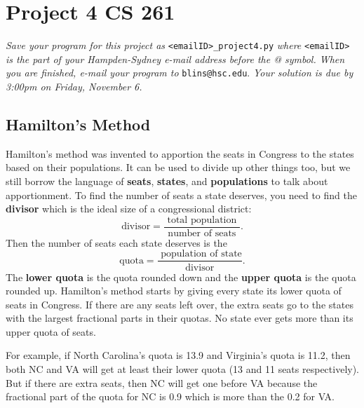 \documentclass[11pt]{article}
\begin{document}
\section*{Project 4 \hfill CS 261}

\textit{Save your program for this project as} \verb|<emailID>_project4.py| \textit{where} \verb|<emailID>| \textit{is the part of your Hampden-Sydney e-mail address before the @ symbol. When you are finished, e-mail your program to} \verb|blins@hsc.edu|. \textit{Your solution is due by 3:00pm on Friday, November 6. }

\subsection*{Hamilton's Method}

Hamilton's method was invented to apportion the seats in Congress to the states based on their populations. It can be used to divide up other things too, but we still borrow the language of \textbf{seats}, \textbf{states}, and \textbf{populations} to talk about apportionment.  To find the number of seats a state deserves, you need to find the \textbf{divisor} which is the ideal size of a congressional district:
$$\text{divisor} = \frac{ \text{ total population }}{\text{ number of seats }}.$$
Then the number of seats each state deserves is the  
$$\text{quota} = \frac{ \text{ population of state}}{\text{ divisor }}.$$
The \textbf{lower quota} is the quota rounded down and the \textbf{upper quota} is the quota rounded up. Hamilton's method starts by giving every state its lower quota of seats in Congress.  If there are any seats left over, the extra seats go to the states with the largest fractional parts in their quotas.  No state ever gets more than its upper quota of seats.  

For example, if North Carolina's quota is 13.9 and Virginia's quota is 11.2, then both NC and VA will get at least their lower quota (13 and 11 seats respectively).  But if there are extra seats, then NC will get one before VA because the fractional part of the quota for NC is 0.9 which is more than the 0.2 for VA. 
\end{document}
